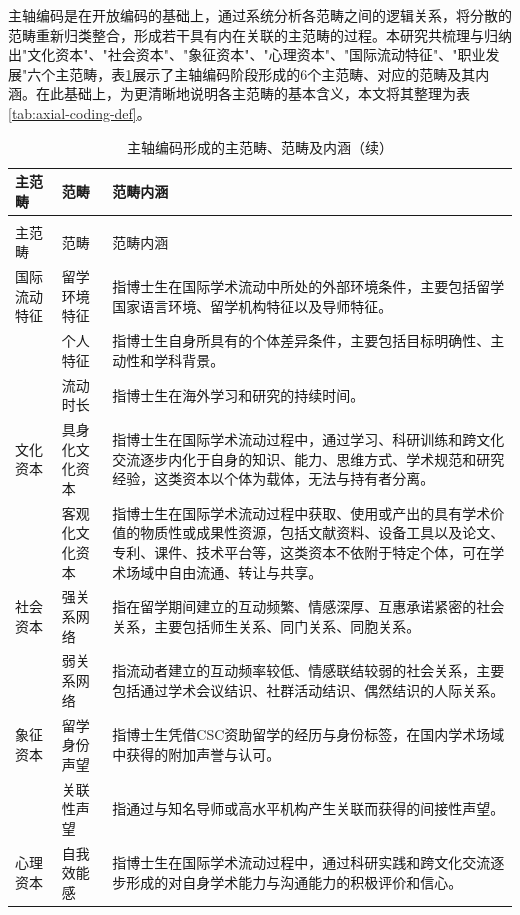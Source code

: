 主轴编码是在开放编码的基础上，通过系统分析各范畴之间的逻辑关系，将分散的范畴重新归类整合，形成若干具有内在关联的主范畴的过程。本研究共梳理与归纳出"文化资本"、"社会资本"、"象征资本"、"心理资本"、"国际流动特征"、"职业发展"六个主范畴，表\ref{tab:axial-coding}展示了主轴编码阶段形成的6个主范畴、对应的范畴及其内涵。在此基础上，为更清晰地说明各主范畴的基本含义，本文将其整理为表\ref{tab:axial-coding-def}。

{\small
\begin{longtable}{p{2cm}p{2.5cm}p{9.5cm}}
\caption{主轴编码形成的主范畴、范畴及内涵} \label{tab:axial-coding} \\
\toprule
主范畴 & 范畴 & 范畴内涵 \\
\midrule
\endfirsthead
\caption[]{主轴编码形成的主范畴、范畴及内涵（续）} \\
\toprule
主范畴 & 范畴 & 范畴内涵 \\
\midrule
\endhead
\bottomrule
\endfoot
国际流动特征 & 留学环境特征 & 指博士生在国际学术流动中所处的外部环境条件，主要包括留学国家语言环境、留学机构特征以及导师特征。 \\
 & 个人特征 & 指博士生自身所具有的个体差异条件，主要包括目标明确性、主动性和学科背景。 \\
 & 流动时长 & 指博士生在海外学习和研究的持续时间。 \\
文化资本 & 具身化文化资本 & 指博士生在国际学术流动过程中，通过学习、科研训练和跨文化交流逐步内化于自身的知识、能力、思维方式、学术规范和研究经验，这类资本以个体为载体，无法与持有者分离。 \\
 & 客观化文化资本 & 指博士生在国际学术流动过程中获取、使用或产出的具有学术价值的物质性或成果性资源，包括文献资料、设备工具以及论文、专利、课件、技术平台等，这类资本不依附于特定个体，可在学术场域中自由流通、转让与共享。 \\
社会资本 & 强关系网络 & 指在留学期间建立的互动频繁、情感深厚、互惠承诺紧密的社会关系，主要包括师生关系、同门关系、同胞关系。 \\
 & 弱关系网络 & 指流动者建立的互动频率较低、情感联结较弱的社会关系，主要包括通过学术会议结识、社群活动结识、偶然结识的人际关系。 \\
象征资本 & 留学身份声望 & 指博士生凭借CSC资助留学的经历与身份标签，在国内学术场域中获得的附加声誉与认可。 \\
 & 关联性声望 & 指通过与知名导师或高水平机构产生关联而获得的间接性声望。 \\
心理资本 & 自我效能感 & 指博士生在国际学术流动过程中，通过科研实践和跨文化交流逐步形成的对自身学术能力与沟通能力的积极评价和信心。 \\

\end{longtable}}
